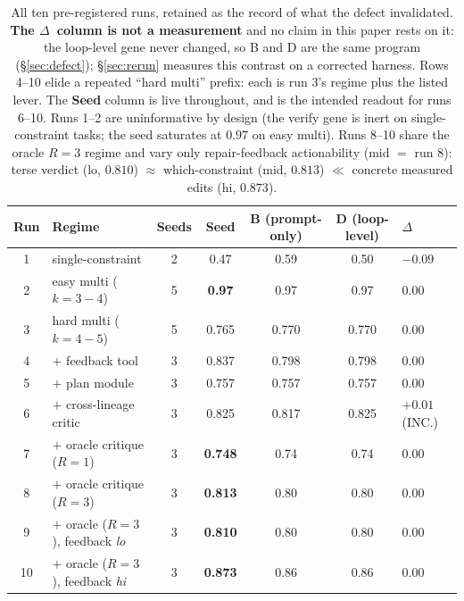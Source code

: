 \documentclass[11pt]{article}
\newcommand{\dd}{\ensuremath{\Delta}}
\begin{document}
\begin{table}[t]
\centering
\small
\setlength{\tabcolsep}{4.5pt}
\begin{tabular}{clccccl}
\toprule
Run & Regime & Seeds & Seed & B (prompt-only) & D (loop-level) & \dd \\
\midrule
1 & single-constraint        & 2 & 0.47 & 0.59 & 0.50 & $-0.09$ \\
2 & easy multi ($k{=}3{-}4$) & 5 & \textbf{0.97} & 0.97 & 0.97 & $0.00$ \\
3 & hard multi ($k{=}4{-}5$) & 5 & 0.765 & 0.770 & 0.770 & $\mathbf{0.00}$ \\
4 & \quad $+$ feedback tool  & 3 & 0.837 & 0.798 & 0.798 & $\mathbf{0.00}$ \\
5 & \quad $+$ plan module    & 3 & 0.757 & 0.757 & 0.757 & $\mathbf{0.00}$ \\
6 & \quad $+$ cross-lineage critic & 3 & 0.825 & 0.817 & 0.825 & $+0.01$ (INC.) \\
7 & \quad $+$ oracle critique ($R{=}1$) & 3 & \textbf{0.748} & 0.74 & 0.74 & $\mathbf{0.00}$ \\
8 & \quad $+$ oracle critique ($R{=}3$) & 3 & \textbf{0.813} & 0.80 & 0.80 & $\mathbf{0.00}$ \\
9 & \quad $+$ oracle ($R{=}3$), feedback \emph{lo} & 3 & \textbf{0.810} & 0.80 & 0.80 & $\mathbf{0.00}$ \\
10 & \quad $+$ oracle ($R{=}3$), feedback \emph{hi} & 3 & \textbf{0.873} & 0.86 & 0.86 & $\mathbf{0.00}$ \\
\bottomrule
\end{tabular}
\caption{All ten pre-registered runs, retained as the record of what the defect
invalidated. \textbf{The \dd\ column is not a measurement} and no claim in this paper
rests on it: the loop-level gene never changed, so B and D are the same program
(\S\ref{sec:defect}); \S\ref{sec:rerun} measures this contrast on a corrected harness.
Rows 4--10 elide a repeated ``hard multi'' prefix: each is run 3's regime plus the listed lever. The \textbf{Seed} column is live throughout, and is the intended readout for runs 6--10.
Runs 1--2 are uninformative by design (the verify gene is inert on single-constraint
tasks; the seed saturates at $0.97$ on easy multi). Runs 8--10 share the oracle $R{=}3$
regime and vary only repair-feedback actionability (mid $=$ run 8): terse verdict (lo,
$0.810$) $\approx$ which-constraint (mid, $0.813$) $\ll$ concrete measured edits (hi,
$0.873$).}
\label{tab:results}
\end{table}
\end{document}

